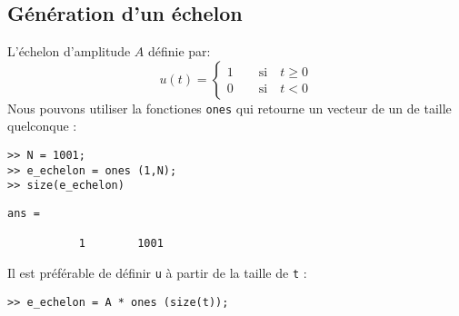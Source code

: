 \subsection{Génération d'un échelon}
L'échelon d'amplitude $A$ définie par:
\[
    u(t)=\begin{cases}
        1 \qquad \textrm{si} \quad t\geq 0 \\
        0 \qquad \textrm{si} \quad t<0
         \end{cases}
\]
Nous pouvons utiliser la fonctiones \texttt{ones} qui retourne un vecteur 
de un de taille quelconque :  
\begin{verbatim}
>> N = 1001;
>> e_echelon = ones (1,N);
>> size(e_echelon)
\end{verbatim}
\begin{verbatim}
ans =

           1        1001
\end{verbatim}
Il est préférable de définir \texttt{u} à partir de la taille de \texttt{t} :
\begin{verbatim}
>> e_echelon = A * ones (size(t));
\end{verbatim}
